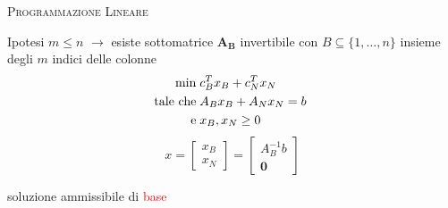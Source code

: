 
\begin{frame}{\textsc{\LARGE Programmazione Lineare}}

Ipotesi $m \leq n$ \pause$\longrightarrow$ esiste sottomatrice $\mathbf{A_{B}}$ invertibile con
$B\subseteq\{1,\dots,n\}$ insieme degli $m$ indici delle colonne 
\pause
\begin{equation*}
\begin{split}
\min\;&c_{B}^{T}x_{B}+c_{N}^{T}x_{N}\\
\text{tale che\;}&A_{B}x_{B}+A_{N}x_{N}= b\;\\\text{e\;}&x_{B},x_{N}\geq0
\end{split}
\end{equation*}
\pause
\begin{equation*}
x = \left[\begin{matrix}x_{B}\\x_{N}\end{matrix}\right] = \left[\begin{matrix}A_{B}^{-1}b\\\mathbf{0}\end{matrix}\right]
\end{equation*}
\begin{center}
	soluzione ammissibile di \textcolor{red}{base}
\end{center}
\end{frame}


